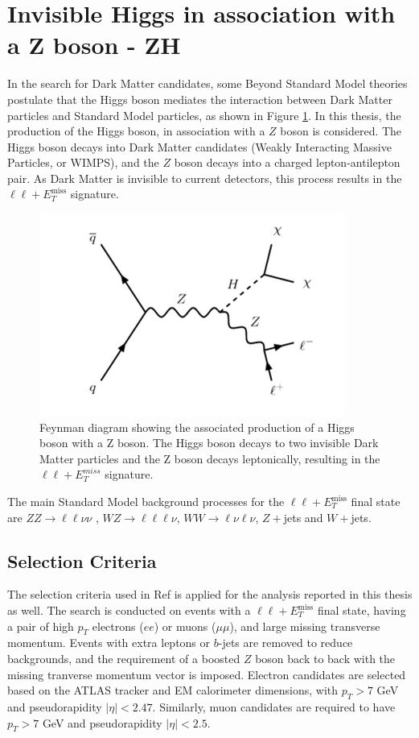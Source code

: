 \documentclass[12pt,a4paper,openright,twoside]{report}
\newcommand{\ZZ}{$ZZ\to \ell\ell\nu\nu$ }
\newcommand{\met}{$E_T^{\mathrm{miss}}$ }
\begin{document}
\section{Invisible Higgs in association with a Z boson - ZH}
In the search for Dark Matter candidates, some Beyond Standard Model theories postulate that the Higgs boson mediates the interaction between Dark Matter particles and Standard Model particles, as shown in Figure \ref{fig:HZ}. In this thesis, the production of the Higgs boson, in association with a $Z$ boson is considered. The Higgs boson decays into Dark Matter candidates (Weakly Interacting Massive Particles, or WIMPS), and the $Z$ boson decays into a charged lepton-antilepton pair. As Dark Matter is invisible to current detectors, this process results in the $\ell\ell+$\met signature.
\begin{figure}[H]
\centering
	\includegraphics[width=0.5\linewidth]{HZ.png}
	\caption{Feynman diagram showing the associated production of a Higgs boson with a Z boson. The Higgs boson decays to two invisible Dark Matter particles and the Z boson decays leptonically, resulting in the $\ell\ell+ E_T^{miss}$ signature.}
		\label{fig:HZ}
\end{figure}
The main Standard Model background processes for the $\ell\ell+$\met final state are \ZZ, $WZ\to \ell\ell\ell\nu$, $WW\to \ell\nu \ell\nu$, $Z+$jets and $W+$jets. 

\subsection{Selection Criteria}
The selection criteria used in Ref \cite{ZH_ATLAS} is applied for the analysis reported in this thesis as well. The search is conducted on events with a $\ell\ell+$\met final state, having a pair of high $p_T$ electrons ($ee$) or muons ($\mu\mu$), and large missing transverse momentum. Events with extra leptons or $b$-jets are removed to reduce backgrounds, and the requirement of a boosted $Z$ boson back to back with the missing tranverse momentum vector is imposed. Electron candidates are selected based on the ATLAS tracker and EM calorimeter dimensions, with $p_T > 7$ GeV and pseudorapidity $|\eta| < 2.47$. Similarly, muon candidates are required to have $p_T > 7$ GeV and pseudorapidity $|\eta| < 2.5$.
\end{document}
